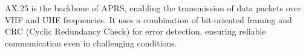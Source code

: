 AX.25 is the backbone of APRS, enabling the transmission of data packets over VHF and UHF frequencies. It uses a combination of bit-oriented framing and CRC (Cyclic Redundancy Check) for error detection, ensuring reliable communication even in challenging conditions.

